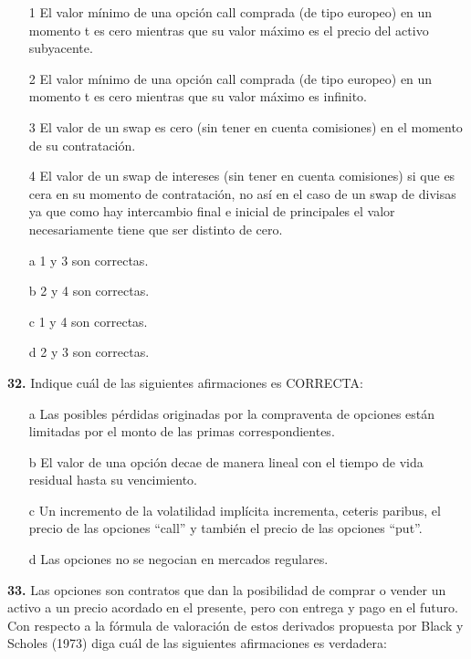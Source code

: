 \documentclass{nuevotema}
\begin{document}
\begin{itemize}
	\item[1] El valor mínimo de una opción call comprada (de tipo europeo) en un momento t es cero mientras que su valor máximo es el precio del activo subyacente.
	\item[2] El valor mínimo de una opción call comprada (de tipo europeo) en un momento t es cero mientras que su valor máximo es infinito.
	\item[3] El valor de un swap es cero (sin tener en cuenta comisiones) en el momento de su contratación.
	\item[4] El valor de un swap de intereses (sin tener en cuenta comisiones) si que es cera en su momento de contratación, no así en el caso de un swap de divisas ya que como hay intercambio final e inicial de principales el valor necesariamente tiene que ser distinto de cero.
\end{itemize}

\begin{itemize}
	\item[a] 1 y 3 son correctas.
	\item[b] 2 y 4 son correctas.
	\item[c] 1 y 4 son correctas.
	\item[d] 2 y 3 son correctas.
\end{itemize}


\textbf{32.} Indique cuál de las siguientes afirmaciones es CORRECTA:

\begin{itemize}
	\item[a] Las posibles pérdidas originadas por la compraventa de opciones están limitadas por el monto de las primas correspondientes.
	\item[b] El valor de una opción decae de manera lineal con el tiempo de vida residual hasta su vencimiento.
	\item[c] Un incremento de la volatilidad implícita incrementa, ceteris paribus, el precio de las opciones ``call'' y también el precio de las opciones ``put''.
	\item[d] Las opciones no se negocian en mercados regulares. 
\end{itemize}


\textbf{33.} Las opciones son contratos que dan la posibilidad de comprar o vender un activo a un precio acordado en el presente, pero con entrega y pago en el futuro. Con respecto a la fórmula de valoración de estos derivados propuesta por Black y Scholes (1973) diga cuál de las siguientes afirmaciones es verdadera:
\end{document}
